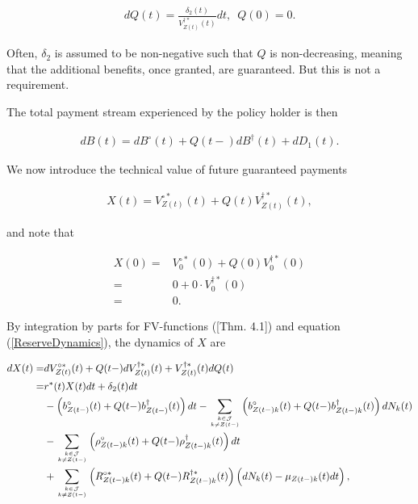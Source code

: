 \documentclass{book}
\newcommand{\1}[1]{\mathbbm{1}_{\left\lbrace #1 \right\rbrace}}
\theoremstyle{break}
\theoremstyle{remark}
\numberwithin{equation}{section}
\begin{document}
\begin{align} \label{QDynamics}
dQ(t) = \frac{\delta_2(t)}{V_{Z(t)}^{\dagger*}(t)}  dt, \, \, \, Q(0)=0.
\end{align}

Often, $\delta_2$ is assumed to be non-negative such that $Q$ is non-decreasing, meaning that the additional benefits, once granted, are guaranteed. But this is not a requirement.

The total payment stream experienced by the policy holder is then

\begin{align} \label{WithProfitTotalBenefits}
dB(t) = dB^\circ(t) + Q(t-) dB^\dagger(t) + dD_1(t).
\end{align}

We now introduce the technical value of future guaranteed payments

\begin{align*}
X(t) = V_{Z(t)}^{\circ*}(t) + Q(t) V_{Z(t)}^{\dagger*}(t),
\end{align*}

and note that 

\begin{align*}
X(0) =& V_{0}^{\circ*}(0) + Q(0) V_{0}^{\dagger*}(0) \\
=& 0 + 0 \cdot V_{0}^{\dagger*}(0) \\
=& 0.
\end{align*}

By integration by parts for FV-functions (\cite{Livstok}[Thm. 4.1]) and equation (\ref{ReserveDynamics}), the dynamics of $X$ are

\begin{align} \label{XDynamics}
\begin{split}
dX(t) =& dV_{Z(t)}^{\circ*}(t) + Q(t-) dV_{Z(t)}^{\dagger*}(t) + V_{Z(t)}^{\dagger*}(t) dQ(t) \\
=& r^*(t) X(t) dt + \delta_2(t)dt \\
&- \left( b_{Z(t-)}^\circ(t) + Q(t-) b_{Z(t-)}^\dagger(t) \right) dt - \sum_{k \in \mathcal{J} \atop k \neq Z(t-)} \left( b_{Z(t-)k}^\circ(t) + Q(t-) b_{Z(t-)k}^\dagger(t)\right) dN_k(t) \\
&- \sum_{k \in \mathcal{J} \atop k \neq Z(t-)} \left( \rho_{Z(t-)k}^\circ(t) + Q(t-) \rho_{Z(t-)k}^\dagger(t) \right) dt \\
&+ \sum_{k \in \mathcal{J} \atop k \neq Z(t-)} \left( R_{Z(t-)k}^{\circ*}(t) + Q(t-) R_{Z(t-)k}^{\dagger*}(t) \right) \left( dN_k(t) - \mu_{Z(t-)k}(t) dt \right),
\end{split}
\end{align}
\end{document}
